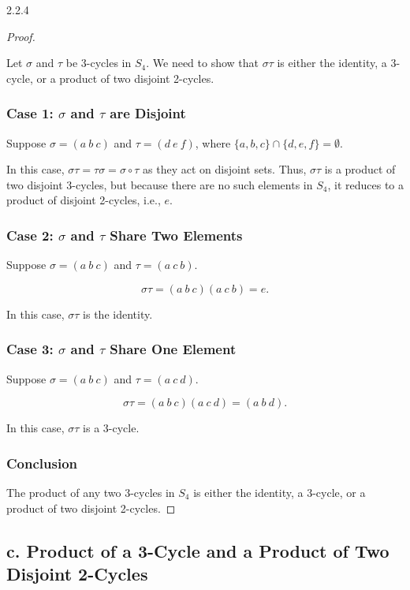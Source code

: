 \documentclass[12pt]{amsart}
\theoremstyle{definition}
\numberwithin{equation}{section}
\begin{document}
\begin{exercise}{2.2.4}
    \begin{proof} \( \)
    
    Let \(\sigma\) and \(\tau\) be 3-cycles in \(S_4\). We need to show that \(\sigma \tau\) is either the identity, a 3-cycle, or a product of two disjoint 2-cycles.
    
    \subsubsection*{Case 1: \(\sigma\) and \(\tau\) are Disjoint}
    Suppose \(\sigma = (a \ b \ c)\) and \(\tau = (d \ e \ f)\), where \(\{a, b, c\} \cap \{d, e, f\} = \emptyset\).
    
    In this case, \(\sigma \tau = \tau \sigma = \sigma \circ \tau\) as they act on disjoint sets. Thus, \(\sigma \tau\) is a product of two disjoint 3-cycles, but because there are no such elements in \(S_4\), it reduces to a product of disjoint 2-cycles, i.e., \(e\).
    
    \subsubsection*{Case 2: \(\sigma\) and \(\tau\) Share Two Elements}
    Suppose \(\sigma = (a \ b \ c)\) and \(\tau = (a \ c \ b)\).
    
    \[
    \sigma \tau = (a \ b \ c)(a \ c \ b) = e.
    \]
    
    In this case, \(\sigma \tau\) is the identity.
    
    \subsubsection*{Case 3: \(\sigma\) and \(\tau\) Share One Element}
    Suppose \(\sigma = (a \ b \ c)\) and \(\tau = (a \ c \ d)\).
    
    \[
    \sigma \tau = (a \ b \ c)(a \ c \ d) = (a \ b \ d).
    \]
    
    In this case, \(\sigma \tau\) is a 3-cycle.
    
    \subsubsection*{Conclusion}
    The product of any two 3-cycles in \(S_4\) is either the identity, a 3-cycle, or a product of two disjoint 2-cycles.
    
    \end{proof}
    
    \subsection*{\textbf{c. Product of a 3-Cycle and a Product of Two Disjoint 2-Cycles}}
    

\end{exercise}
\end{document}
